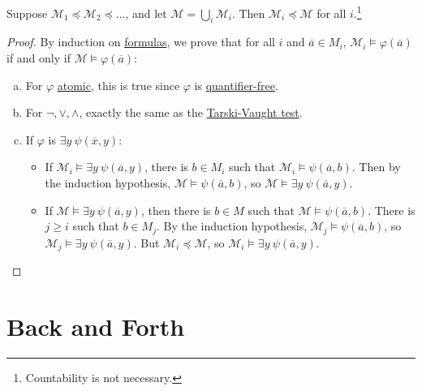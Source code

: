 \begin{proposition}
	Suppose \(\mathcal{M} _1 \preceq \mathcal{M} _2 \preceq \ldots \), and let \(\mathcal{M} = \bigcup_{i} \mathcal{M} _i\). Then \(\mathcal{M} _i \preceq \mathcal{M} \) for all \(i\).\footnote{Countability is not necessary.}
\end{proposition}
\begin{proof}
	By induction on \hyperref[def:formula]{formulas}, we prove that for all \(i\) and \(\overline{a} \in M_i\), \(\mathcal{M} _i \models \varphi (\overline{a} )\) if and only if \(\mathcal{M} \models \varphi (\overline{a} )\):
	\begin{enumerate}[(a)]
		\item For \(\varphi \) \hyperref[not:atomic]{atomic}, this is true since \(\varphi \) is \hyperref[not:quantifier-free]{quantifier-free}.
		\item For \(\lnot, \lor, \land \), exactly the same as the \hyperref[prop:Tarski-Vaught-test]{Tarski-Vaught test}.
		\item If \(\varphi \) is \(\exists y\ \psi (\overline{x} , y)\):
		      \begin{itemize}
			      \item If \(\mathcal{M} _i \models \exists y\ \psi (\overline{a} , y)\), there is \(b\in M_i\) such that \(\mathcal{M} _i \models \psi (\overline{a} , b)\). Then by the induction hypothesis, \(\mathcal{M} \models \psi (\overline{a} , b)\), so \(\mathcal{M} \models \exists y\ \psi (\overline{a} , y)\).
			      \item If \(\mathcal{M} \models \exists y\ \psi (\overline{a} , y)\), then there is \(b\in M\) such that \(\mathcal{M} \models \psi (\overline{a} , b)\). There is \(j \geq i\) such that \(b\in M_j\). By the induction hypothesis, \(\mathcal{M} _j \models \psi (\overline{a} , b)\), so \(\mathcal{M} _j \models \exists y\ \psi (\overline{a} , y)\). But \(\mathcal{M} _i \preceq \mathcal{M} \), so \(\mathcal{M} _i \models \exists y\ \psi (\overline{a} , y)\).
		      \end{itemize}
	\end{enumerate}
\end{proof}

\section{Back and Forth}
